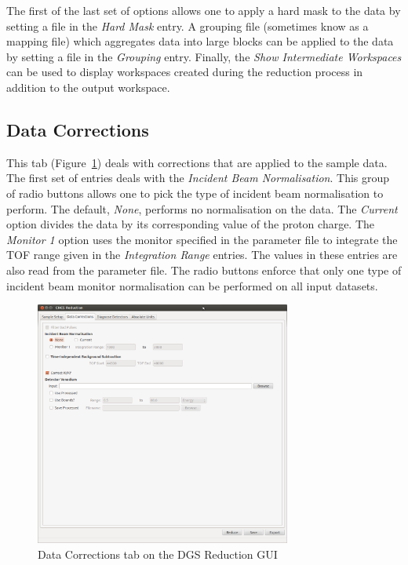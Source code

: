 The first of the last set of options allows one to apply a hard mask to the data by setting a file in the \textit{Hard Mask} entry. A grouping file (sometimes know as a mapping file) which aggregates data into large blocks can be applied to the data by setting a file in the \textit{Grouping} entry. Finally, the \textit{Show Intermediate Workspaces} can be used to display workspaces created during the reduction process in addition to the output workspace. 
\subsection{Data Corrections}
This tab (Figure~\ref{fig:DataCorr}) deals with corrections that are applied to the sample data. The first set of entries deals with the \textit{Incident Beam Normalisation}. This group of radio buttons allows one to pick the type of incident beam normalisation to perform. The default, \textit{None}, performs no normalisation on the data. The \textit{Current} option divides the data by its corresponding value of the proton charge. The \textit{Monitor 1} option uses the monitor specified in the parameter file to integrate the TOF range given in the \textit{Integration Range} entries. The values in these entries are also read from the parameter file. The radio buttons enforce that only one type of incident beam monitor normalisation can be performed on all input datasets.

\begin{figure}[ht]
\centerline{\includegraphics[width=0.75\textwidth]{figures/DataCorrections.png}}
\caption{Data Corrections tab on the DGS Reduction GUI}
\label{fig:DataCorr}
\end{figure}

